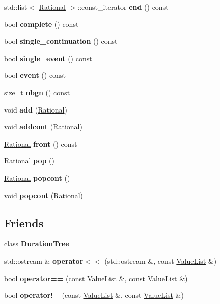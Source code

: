 \begin{DoxyCompactItemize}
std\+::list$<$ \mbox{\hyperlink{classRational}{Rational}} $>$\+::const\+\_\+iterator {\bfseries end} () const
\item 
bool {\bfseries complete} () const
\item 
bool {\bfseries single\+\_\+continuation} () const
\item 
bool {\bfseries single\+\_\+event} () const
\item 
bool {\bfseries event} () const
\item 
\mbox{\label{classValueList_a502abe52ee55ed7616fcfadfa4f1e070}} 
size\+\_\+t {\bfseries nbgn} () const
\item 
void {\bfseries add} (\mbox{\hyperlink{classRational}{Rational}})
\item 
void {\bfseries addcont} (\mbox{\hyperlink{classRational}{Rational}})
\item 
\mbox{\hyperlink{classRational}{Rational}} {\bfseries front} () const
\item 
\mbox{\hyperlink{classRational}{Rational}} {\bfseries pop} ()
\item 
\mbox{\hyperlink{classRational}{Rational}} {\bfseries popcont} ()
\item 
void {\bfseries popcont} (\mbox{\hyperlink{classRational}{Rational}})
\end{DoxyCompactItemize}
\subsection*{Friends}
\begin{DoxyCompactItemize}
\item 
\mbox{\label{classValueList_ac2b4a94933f9bce2e3d22e24f3241b5c}} 
class {\bfseries Duration\+Tree}
\item 
\mbox{\label{classValueList_a4fe20efc2fe57b6157614981454150ce}} 
std\+::ostream \& {\bfseries operator$<$$<$} (std\+::ostream \&, const \mbox{\hyperlink{classValueList}{Value\+List}} \&)
\item 
\mbox{\label{classValueList_aef2098e53ce9107c6e32d151864b69ad}} 
bool {\bfseries operator==} (const \mbox{\hyperlink{classValueList}{Value\+List}} \&, const \mbox{\hyperlink{classValueList}{Value\+List}} \&)
\item 
\mbox{\label{classValueList_ac02c266a581148fe8a09a49d0ac6b161}} 
bool {\bfseries operator!=} (const \mbox{\hyperlink{classValueList}{Value\+List}} \&, const \mbox{\hyperlink{classValueList}{Value\+List}} \&)
\end{DoxyCompactItemize}


